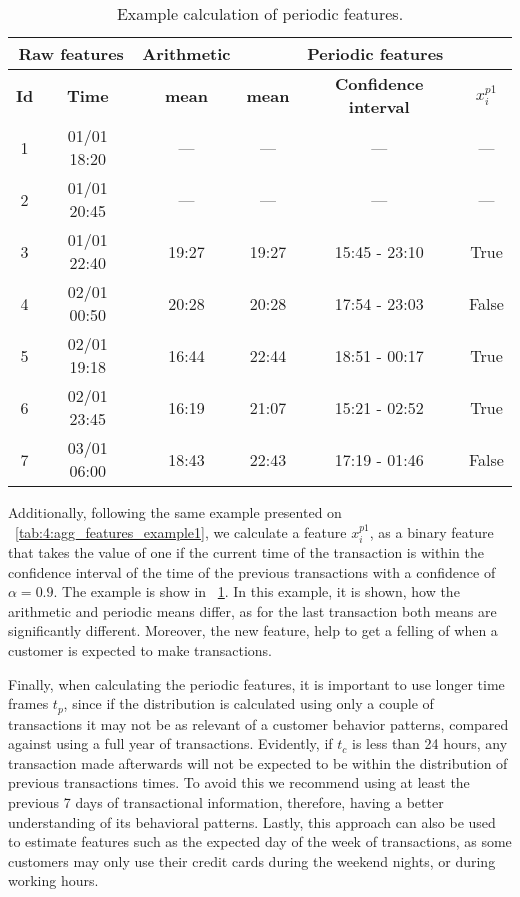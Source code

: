 	\begin{table}[!t]
   \centering
   \footnotesize
   \begin{tabular}{|c c | c c c c|}
   \hline
   \multicolumn{2}{|c|}{\textbf{Raw features}} & \textbf{Arithmetic} & 
\multicolumn{3}{c|}{\textbf{Periodic features}} \\  \hline
   \textbf{Id} & \textbf{Time} & \textbf{mean} & \textbf{mean} & 
    \textbf{Confidence interval} & $x_i^{p1}$ \\
   \hline
		1& 01/01 18:20& --- & ---	 &	--- & ---\\
		2& 01/01 20:45& --- & ---	 &---	 & ---\\
		3& 01/01 22:40& 19:27 & 19:27 & 15:45 - 23:10 & True \\
		4& 02/01 00:50& 20:28 & 20:28 & 17:54 - 23:03 & False\\
		5& 02/01 19:18& 16:44 & 22:44 & 18:51 - 00:17 & True\\
		6& 02/01 23:45& 16:19 & 21:07 & 15:21 - 02:52 & True\\
		7& 03/01 06:00& 18:43 & 22:43 & 17:19 - 01:46 & False\\
   \hline
   \end{tabular}
   \caption{Example calculation of periodic features.}
   \label{tab:4:agg_features_example2}
   \end{table}

Additionally, following the same example presented on 
\tablename{~\ref{tab:4:agg_features_example1}}, we calculate a feature $x_i^{p1}$, as a binary 
feature that takes the value of one if the current  time of the transaction is within the 
confidence interval of the time of the previous  transactions with a confidence of $\alpha=0.9$. 
The example is show in \tablename{~\ref{tab:4:agg_features_example2}}. In this example, it is 
shown, how the arithmetic and periodic   means differ, as for the last transaction both means are 
significantly different. Moreover, the  new feature, help to get a felling of when a customer is 
expected to make transactions.
  
  Finally, when calculating the periodic features, it is important to use longer time frames $t_p$, 
  since if the distribution is calculated using only a couple of transactions it may not be as 
  relevant of a customer behavior patterns, compared against using a full year of transactions.
  Evidently, if $t_c$ is less than 24 hours, any transaction made afterwards will not be expected 
  to be within the distribution of previous transactions times. To avoid this we recommend using at 
  least the previous 7 days of transactional information, therefore, having a better understanding 
  of its behavioral patterns. Lastly, this approach can also be used to estimate features such as 
  the expected day of the week  of transactions, as some customers may only use their credit cards 
  during the weekend nights, or during working hours.
	
